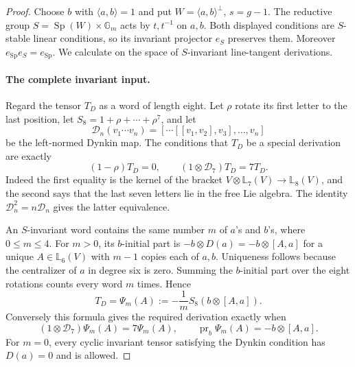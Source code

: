 \begin{proof}
Choose $b$ with $\langle a,b\rangle=1$ and put
$W=\langle a,b\rangle^\perp$, $s=g-1$.
The reductive group $S=\operatorname{Sp}(W)\times\mathbb G_m$
acts by $t,t^{-1}$ on $a,b$. Both displayed conditions are
$S$-stable linear conditions, so its invariant projector
$e_S$ preserves them. Moreover
$e_{\operatorname{Sp}}e_S=e_{\operatorname{Sp}}$.
We calculate on the space of $S$-invariant line-tangent
derivations.

\paragraph{The complete invariant input.}
Regard the tensor $T_D$ as a word of length eight.
Let $\rho$ rotate its first letter to the last position,
let $S_8=1+\rho+\cdots+\rho^7$, and let
\[
 \mathcal D_n(v_1\cdots v_n)
       =[\cdots[[v_1,v_2],v_3],\ldots,v_n]
\]
be the left-normed Dynkin map. The conditions that $T_D$
be a special derivation are exactly
\[
 (1-\rho)T_D=0,\qquad
 (1\otimes\mathcal D_7)T_D=7T_D.
\]
Indeed the first equality is the kernel of the bracket
$V\otimes\mathbb L_7(V)\to\mathbb L_8(V)$, and the
second says that the last seven letters lie in the free
Lie algebra. The identity $\mathcal D_n^2=n\mathcal D_n$
gives the latter equivalence.

An $S$-invariant word contains the same number $m$ of
$a$'s and $b$'s, where $0\leq m\leq4$.
For $m>0$, its $b$-initial part is
$-b\otimes D(a)=-b\otimes[A,a]$ for a unique
$A\in\mathbb L_6(V)$ with $m-1$ copies each of $a,b$.
Uniqueness follows because the centralizer of $a$ in
degree six is zero. Summing the $b$-initial part over the
eight rotations counts every word $m$ times. Hence
\[
 T_D=\Psi_m(A):=-\frac1m S_8(b\otimes[A,a]).
\]
Conversely this formula gives the required derivation
exactly when
\begin{equation}\label{eq:line-input-constraints}
 (1\otimes\mathcal D_7)\Psi_m(A)=7\Psi_m(A),\qquad
 \operatorname{pr}_b\Psi_m(A)=-b\otimes[A,a].
\end{equation}
For $m=0$, every cyclic invariant tensor satisfying the
Dynkin condition has $D(a)=0$ and is allowed.


\end{proof}
